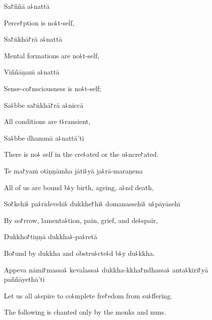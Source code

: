 Sa꜓ññā a꜕nattā

\begin{english}
  Perce꜓ption is no꜕t-self,
\end{english}

Sa꜓ṅkhā꜓rā a꜕nattā

\begin{english}
  Mental formations are no꜕t-self,
\end{english}

Viññāṇaṁ a꜕nattā

\begin{english}
  Sense-co꜓nsciousness is no꜕t-self;
\end{english}

Sa꜕bbe sa꜓ṅkhā꜓rā a꜕niccā

\begin{english}
  All conditions are t꜕ransient,
\end{english}

Sa꜕bbe dhammā a꜕nattā'ti

\begin{english}
  There is no꜕ self in the cre꜕ated or the u꜕ncre꜓ated.
\end{english}

Te ma꜓yaṁ otiṇṇāmha jāti꜕yā ja꜕rā-maraṇena

\begin{english}
  All of us are bound b꜕y birth, ageing, a꜕nd death,
\end{english}

So꜓kehi꜕ pa꜕ridevehi꜕ dukkhe꜓hi꜕ domanassehi꜕ u꜕pāyāsehi

\begin{english}
  By so꜓rrow, lamenta꜕tion, pain, grief, and de꜕spair,
\end{english}

Dukkho꜓tiṇṇā dukkha꜕-pa꜕retā

\begin{english}
  Bo꜓und by dukkha and obstru꜕cte꜕d b꜕y du꜕kkha.
\end{english}

Appeva nāmi꜓massa꜕ kevalassa꜕ dukkha-kkha꜓ndhassa꜕ anta꜕kiri꜓yā \\paññāyethā'ti

\begin{english}
  Let us all a꜕spire to co꜕mplete fre꜓edom from su꜕ffering.
\end{english}

\begin{instruction}
  The following is chanted only by the monks and nuns.
\end{instruction}

